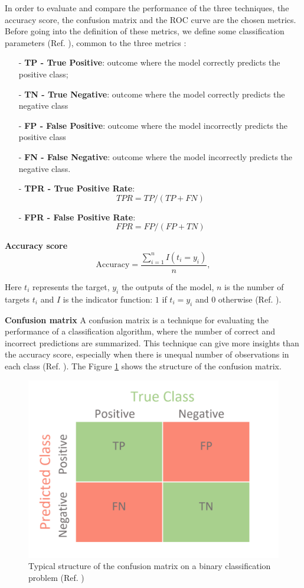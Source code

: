 \documentclass[english,notitlepage,reprint,nofootinbib]{revtex4-1}  %
\begin{document}
In order to evaluate and compare the performance of the three techniques, the accuracy score, the confusion matrix and the ROC curve are the chosen metrics. Before going into the definition of these metrics, we define some classification parameters (Ref. \cite{classpar}), common to the three metrics :

\begin{itemize}
    \item[-] \textbf{TP - True Positive}: outcome where the model correctly predicts the positive class;
    \item[-] \textbf{TN - True Negative}: outcome where the model correctly predicts the negative class
    \item[-] \textbf{FP - False Positive}: outcome where the model incorrectly predicts the positive class
    \item[-] \textbf{FN - False Negative}: outcome where the model incorrectly predicts the negative class.
    \item[-] \textbf{TPR - True Positive Rate}: 
    $$TPR = TP / (TP+FN)$$
    \item[-] \textbf{FPR - False Positive Rate}: 
    $$FPR = FP / (FP+TN)$$
\end{itemize}

\textbf{Accuracy score}
$$
\text{Accuracy} = \frac{\sum_{i=1}^n I(t_i = y_i)}{n} ,
$$

Here $t_i$ represents the target, $y_i$ the outputs of the model, $n$ is the number of targets $t_i$ and $I$ is the indicator function: $1$ if $t_i = y_i$ and $0$
otherwise (Ref. \cite{mortens}).

\textbf{Confusion matrix}
A confusion matrix is a technique for evaluating the performance of a classification algorithm, where the number of correct and incorrect predictions are summarized. This technique can give more insights than the accuracy score, especially when there is unequal number of observations in each class (Ref. \cite{cfm}). The Figure \ref{fig:confmatr} shows the structure of the confusion matrix.

 \begin{figure}[h]
    \centering 
    \includegraphics[scale=0.2]{img/confusion_matrix.png}
    \caption{Typical structure of the confusion matrix on a binary classification problem (Ref. \cite{cfm_fig})}
    \label{fig:confmatr}
\end{figure}
\end{document}
